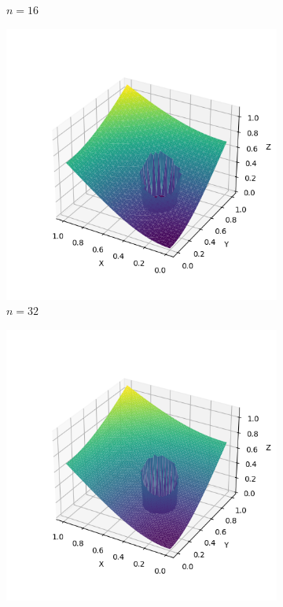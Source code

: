\documentclass[lang=cn,a4paper,newtx,bibend=bibtex]{elegantpaper}
\begin{document}
\begin{figure}[H]
\begin{subfigure}[b]{0.18\textwidth}
      \caption{$n= 16$}
  \end{subfigure}
  \hfill
  \begin{subfigure}[b]{0.18\textwidth}
      \includegraphics[width=\textwidth]{../../res_bac/res-[data|3-Neumann-irregular-c32].png}
      \caption{$n = 32$}
  \end{subfigure}
  \hfill
  \begin{subfigure}[b]{0.18\textwidth}
      \includegraphics[width=\textwidth]{../../res_bac/res-[data|3-Neumann-irregular-d64].png}

\end{subfigure}
\end{figure}
\end{document}
